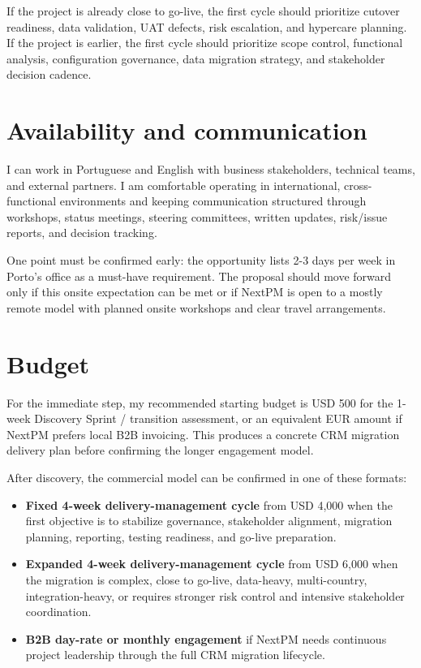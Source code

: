 \documentclass[11pt,a4paper]{article}
\begin{document}
If the project is already close to go-live, the first cycle should prioritize cutover readiness, data validation, UAT defects, risk escalation, and hypercare planning. If the project is earlier, the first cycle should prioritize scope control, functional analysis, configuration governance, data migration strategy, and stakeholder decision cadence.\par

\section*{Availability and communication}

I can work in Portuguese and English with business stakeholders, technical teams, and external partners. I am comfortable operating in international, cross-functional environments and keeping communication structured through workshops, status meetings, steering committees, written updates, risk/issue reports, and decision tracking.\par

One point must be confirmed early: the opportunity lists 2-3 days per week in Porto's office as a must-have requirement. The proposal should move forward only if this onsite expectation can be met or if NextPM is open to a mostly remote model with planned onsite workshops and clear travel arrangements.\par

\section*{Budget}

For the immediate step, my recommended starting budget is USD 500 for the 1-week Discovery Sprint / transition assessment, or an equivalent EUR amount if NextPM prefers local B2B invoicing. This produces a concrete CRM migration delivery plan before confirming the longer engagement model.\par

After discovery, the commercial model can be confirmed in one of these formats:\par

\begin{itemize}
\item \textbf{Fixed 4-week delivery-management cycle} from USD 4,000 when the first objective is to stabilize governance, stakeholder alignment, migration planning, reporting, testing readiness, and go-live preparation.
\item \textbf{Expanded 4-week delivery-management cycle} from USD 6,000 when the migration is complex, close to go-live, data-heavy, multi-country, integration-heavy, or requires stronger risk control and intensive stakeholder coordination.
\item \textbf{B2B day-rate or monthly engagement} if NextPM needs continuous project leadership through the full CRM migration lifecycle.
\end{itemize}
\end{document}

